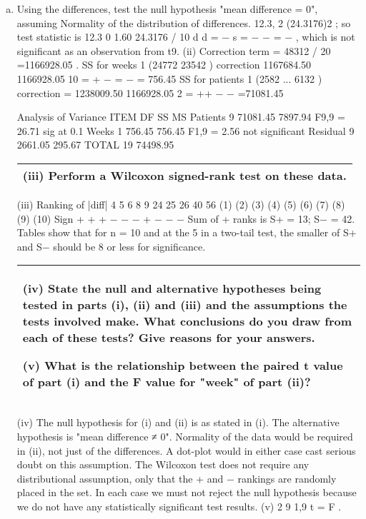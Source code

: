 \documentclass[a4paper,12pt]{article}
\begin{document}
\begin{enumerate}[(a)]
\item  Using the differences, test the null hypothesis "mean difference = 0", assuming
Normality of the distribution of differences.
12.3, 2 (24.3176)2 ; so test statistic is 12.3 0 1.60
24.3176 / 10 d d = − s = − − = − , which is not
significant as an observation from t9.
(ii) Correction term = 48312 / 20 =1166928.05 .
SS for weeks 1 (24772 23542 ) correction 1167684.50 1166928.05
10
= + − = −
= 756.45
SS for patients 1 (2582 ... 6132 ) correction = 1238009.50 1166928.05
2
= ++ − −
=71081.45

Analysis of Variance
ITEM DF SS MS
Patients 9 71081.45 7897.94 F9,9 = 26.71 sig at 0.1%
Weeks 1 756.45 756.45 F1,9 = 2.56 not significant
Residual 9 2661.05 295.67
TOTAL 19 74498.95

\newpage
\begin{table}[ht!]
\centering
\begin{tabular}{|p{15cm}|}
\hline 

(iii) Perform a Wilcoxon signed-rank test on these data. 
 
\\ \hline
\end{tabular}
\end{table}


(iii)
Ranking of |diff| 4 5 6 8 9 24 25 26 40 56
(1) (2) (3) (4) (5) (6) (7) (8) (9) (10)
Sign + + + − − − + − − −
Sum of + ranks is S+ = 13; S− = 42. Tables show that for n = 10 and at the 5%
in a two-tail test, the smaller of S+ and S− should be 8 or less for significance.



\begin{table}[ht!]
\centering
\begin{tabular}{|p{15cm}|}
\hline  
(iv) State the null and alternative hypotheses being tested in parts (i), (ii) and (iii) and the assumptions the tests involved make.  What conclusions do you draw from each of these tests?  Give reasons for your answers.  
 
(v) What is the relationship between the paired t value of part (i) and the F value for "week" of part (ii)?  
 
 
\\ \hline
\end{tabular}
\end{table}
(iv) The null hypothesis for (i) and (ii) is as stated in (i). The alternative
hypothesis is "mean difference ≠ 0". Normality of the data would be required in (ii),
not just of the differences. A dot-plot would in either case cast serious doubt on this
assumption. The Wilcoxon test does not require any distributional assumption, only
that the + and − rankings are randomly placed in the set. In each case we must not
reject the null hypothesis because we do not have any statistically significant test
results.
(v) 2
9 1,9 t = F .


\end{enumerate}
\end{document}
